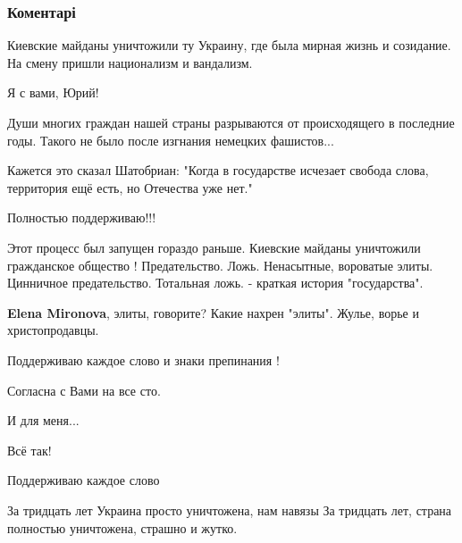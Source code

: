  
 
 
 
 
\subsubsection{Коментарі}
\label{sec:21_11_2021.fb.dudkin_jurij.1.rodina_ukraina.cmt}

\begin{itemize} %
Киевские майданы уничтожили ту Украину, где была мирная жизнь и созидание. На смену пришли национализм и вандализм.

Я с вами, Юрий!

Души многих граждан нашей страны разрываются от происходящего в последние годы. Такого не было после изгнания немецких фашистов...

Кажется это сказал Шатобриан: "Когда в государстве исчезает свобода слова, территория ещё есть, но Отечества уже нет."

Полностью поддерживаю!!!


Этот процесс был запущен гораздо раньше. Киевские майданы уничтожили
гражданское общество ! Предательство. Ложь. Ненасытные, вороватые элиты.
Цинничное предательство. Тотальная ложь. - краткая история "государства".

\begin{itemize} %
\textbf{Elena Mironova}, элиты, говорите? Какие нахрен "элиты". Жулье, ворье и христопродавцы.
\end{itemize} %

Поддерживаю каждое слово и знаки препинания !

Согласна с Вами на все сто.

И для меня...

Всё так!

Поддерживаю каждое слово

За тридцать лет Украина просто уничтожена, нам навязы
За тридцать лет, страна полностью уничтожена, страшно и жутко.


\end{itemize}
